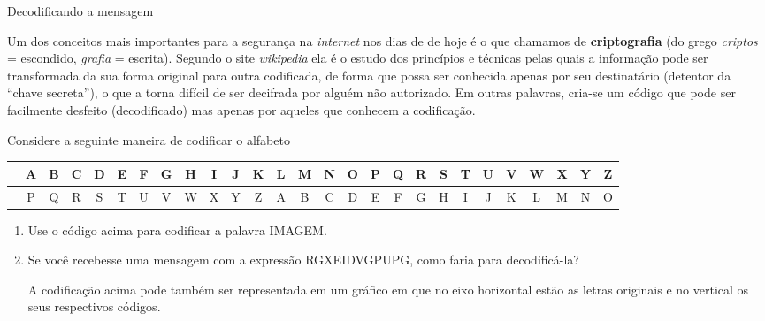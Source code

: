 \begin{task}{ Decodificando a mensagem}
\label{\detokenize{AF106-A:atividade-decodificando-a-mensagem}}\label{\detokenize{AF106-A:ativ-decodificando}}

Um dos conceitos mais importantes para a segurança na \emph{internet} nos dias de de hoje é o que chamamos de \textbf{criptografia} (do grego \emph{criptos} = escondido, \emph{grafia} = escrita). Segundo o site \emph{wikipedia} ela é o estudo dos princípios e técnicas pelas quais a informação pode ser transformada da sua forma original para outra codificada, de forma que possa ser conhecida apenas por seu destinatário (detentor da “chave secreta”), o que a torna difícil de ser decifrada por alguém não autorizado. Em outras palavras, cria-se um código que pode ser facilmente desfeito (decodificado) mas apenas por aqueles que conhecem a codificação.

Considere a seguinte maneira de codificar o alfabeto

\begin{table}[H]
\centering
\setlength\tabcolsep{3pt}
\begin{tabu} to \textwidth{|c|c|c|c|c|c|c|c|c|c|c|c|c|c|c|c|c|c|c|c|c|c|c|c|c|c|c|}
\hline
{} & A & B & C & D & E & F & G & H & I & J & K & L & M & N & O & P & Q & R & S & T & U & V & W & X & Y & Z \\
\hline
{} & P & Q & R & S & T & U & V & W & X & Y & Z & A & B & C & D & E & F & G & H & I & J & K & L & M & N & O \\
\hline
\end{tabu}
\end{table}

\begin{enumerate}
\item {} 
Use o código acima para codificar a palavra IMAGEM.

\item {} 
Se você recebesse uma mensagem com a expressão RGXEIDVGPUPG, como faria para decodificá-la?

A codificação acima pode também ser representada em um gráfico em que no eixo horizontal estão as letras originais e no vertical os seus respectivos códigos.

\begin{figure}[H]
\centering


\end{figure}
\end{enumerate}
\end{task}
